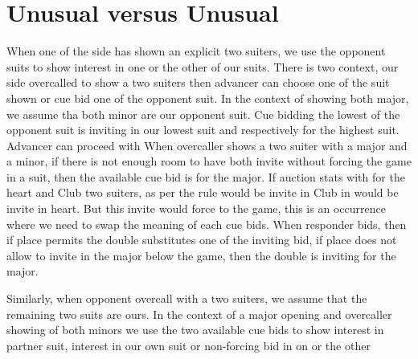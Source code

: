 \section{Unusual versus Unusual}
When one of the side has shown an explicit two suiters, we use the opponent suits to show interest in one or the other of our suits. There is two context, our side overcalled to show a two suiters
then advancer can choose one of the suit shown or cue bid one of the opponent suit. In the context of showing both major, we assume tha both minor are our opponent suit. Cue bidding the lowest of the opponent suit is inviting in our lowest suit and respectively for the highest suit. Advancer can proceed with
When overcaller shows a two suiter with a major and a minor, if there is not enough room to have both invite without forcing the game in a suit, then the available cue bid is for the major. If auction stats with  for the heart and Club two suiters, as per the rule \bid{3\DS} would be invite in Club in \bid{3\SpS} would be invite in heart. But this invite would force to the game, this is an occurrence where we need to swap the meaning of each cue bids. When responder bids, then if place permits the double substitutes one of the inviting bid, if place does not allow to invite in the major below the game, then the double is inviting for the major.  

Similarly, when opponent overcall with a two suiters, we assume that the remaining two suits are ours. In the context of a major opening and overcaller showing of both minors
we use the two available cue bids to show interest in partner suit, interest in our own suit or non-forcing bid in on or the other
